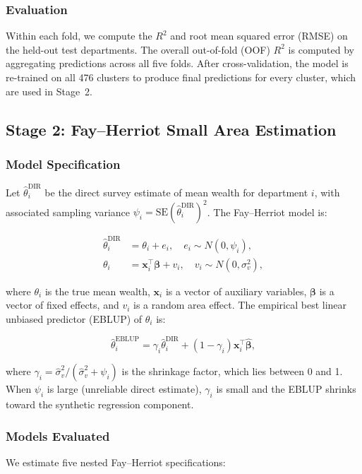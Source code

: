 \documentclass[11pt,a4paper]{article}
\newcommand{\Rtwo}{\ensuremath{R^2}}
\begin{document}
\subsubsection{Evaluation}
Within each fold, we compute the \Rtwo{} and root mean squared error (RMSE) on the held-out test departments. The overall out-of-fold (OOF) \Rtwo{} is computed by aggregating predictions across all five folds. After cross-validation, the model is re-trained on all 476 clusters to produce final predictions for every cluster, which are used in Stage~2.

\subsection{Stage 2: Fay--Herriot Small Area Estimation}
\label{sec:fh}

\subsubsection{Model Specification}
Let $\hat{\theta}_i^\text{DIR}$ be the direct survey estimate of mean wealth for department $i$, with associated sampling variance $\psi_i = \text{SE}(\hat{\theta}_i^\text{DIR})^2$. The Fay--Herriot model \citep{fay1979} is:

\begin{align}
\hat{\theta}_i^\text{DIR} &= \theta_i + e_i, \quad e_i \sim N(0, \psi_i), \label{eq:sampling}\\
\theta_i &= \mathbf{x}_i^\top \boldsymbol{\beta} + v_i, \quad v_i \sim N(0, \sigma_v^2), \label{eq:linking}
\end{align}

\noindent where $\theta_i$ is the true mean wealth, $\mathbf{x}_i$ is a vector of auxiliary variables, $\boldsymbol{\beta}$ is a vector of fixed effects, and $v_i$ is a random area effect. The empirical best linear unbiased predictor (EBLUP) of $\theta_i$ is:

\begin{equation}
\hat{\theta}_i^\text{EBLUP} = \gamma_i \hat{\theta}_i^\text{DIR} + (1 - \gamma_i) \mathbf{x}_i^\top \hat{\boldsymbol{\beta}},
\end{equation}

\noindent where $\gamma_i = \hat{\sigma}_v^2 / (\hat{\sigma}_v^2 + \psi_i)$ is the shrinkage factor, which lies between 0 and 1. When $\psi_i$ is large (unreliable direct estimate), $\gamma_i$ is small and the EBLUP shrinks toward the synthetic regression component.

\subsubsection{Models Evaluated}
We estimate five nested Fay--Herriot specifications:
\end{document}
